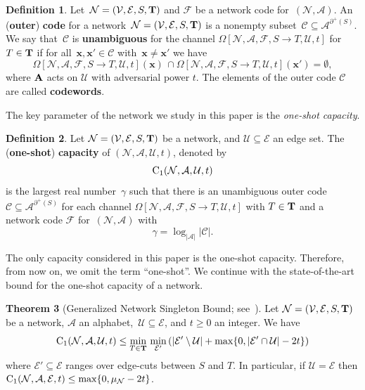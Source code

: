 \documentclass[11pt,a4paper]{article}
\theoremstyle{definition}
\newtheorem{theorem}{Theorem}[section]
\newtheorem{definition}[theorem]{Definition}
\newcommand{\mC}{\mathcal{C}}
\newcommand{\mA}{\mathcal{A}}
\newcommand{\mN}{\mathcal{N}}
\newcommand{\mF}{\mathcal{F}}
\newcommand{\mU}{\mathcal{U}}
\newcommand{\mE}{\mathcal{E}}
\newcommand{\mV}{\mathcal{V}}
\newcommand{\CC}{\textnormal{C}}
\newcommand{\adv}{\textnormal{\textbf{A}}}
\newcommand{\bd}[1]{{\bf #1}}
\newcommand{\bfT}{\bf T}
\newcommand{\degout}{\partial^+}
\begin{document}
\begin{definition}
\label{def:outer}
Let~$\mN=(\mV,\mE,S,{\bf T})$ and $\mF$ be a network code for~$(\mN,\mA)$. An (\textbf{outer}) \textbf{code} for a network~$\mN=(\mV,\mE,S,{\bf T})$ is a nonempty subset~$\mC \subseteq \mA^{\degout(S)}$.
We say that~$\mC$ is \textbf{unambiguous} for the channel $\Omega[\mN,\mA,\mF,S \to T,\mU,t]$ for $T \in \bfT$ if for all~$\mathbf{x}, \mathbf{x}' \in \mC$ with~$\mathbf{x} \neq \mathbf{x}'$ we have
\[
    \Omega[\mN,\mA,\mF,S \to T,\mU,t](\mathbf{x}) \, \cap  \Omega[\mN,\mA,\mF,S \to T,\mU,t](\mathbf{x}') = \emptyset,
\] where $\adv$ acts on $\mU$ with adversarial power $t$. The elements of the outer code $\mC$
are called \textbf{codewords}.
\end{definition}



The key parameter of the network we study in this paper is the \textit{one-shot capacity}.


\begin{definition} 
\label{def:capacities}
Let $\mN=(\mV,\mE, S, \bfT)$ be a network, and
$\mU \subseteq \mE$ an edge set.
The (\textbf{one-shot}) \textbf{capacity}
of $(\mN,\mA,\mU,t)$, denoted by $$\CC_1(\mN,\mA,\mU,t)$$
is the largest 
real number~$\gamma$ such that there is an unambiguous outer code $\mC \subseteq \mA^{\degout(S)}$ for each channel
$\Omega[\mN,\mA,\mF,S \to T,\mU,t]$ with $T \in \bd{T}$
and a network code $\mF$ for~$(\mN,\mA)$ 
with $$\gamma=\log_{|\mA|}|\mC|.$$ 
\end{definition}


The only capacity considered in this paper is the one-shot capacity. Therefore, from now on, we omit the term ``one-shot''.
We continue with the state-of-the-art bound for the one-shot capacity of a network.


\begin{theorem}[Generalized Network Singleton Bound; see~\cite{ravagnani2018adversarial}] 
\label{thm:sbound}
Let $\mN=(\mV,\mE, S, \bfT)$ be a network, $\mA$ an alphabet,~$\mU \subseteq \mE$,
and $t \ge 0$ an integer. 
We have
\[
\CC_1(\mN,\mA,\mU,t) \le \min\limits_{T \in \bfT} \, \min\limits_{\mE'} \left(
\lvert \mE'\setminus \mU \rvert + \max\{0,\lvert \mE' \cap \mU \rvert-2t\} \right)
\]
where $\mE' \subseteq \mE$ ranges over edge-cuts between $S$ and $T$. In particular,
if $\mU = \mE$ then $\CC_1(\mN,\mA,\mE,t) \le \max\{0,\mu_{\mN}-2t\}$.
\end{theorem}
\end{document}
